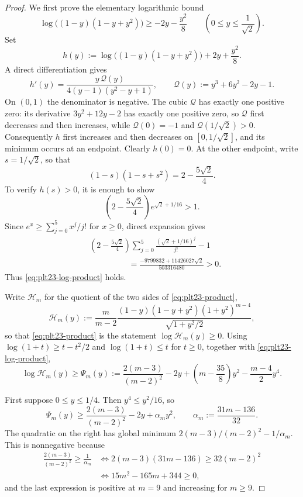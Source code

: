 ﻿\documentclass[11pt]{article}
\numberwithin{equation}{section}
\begin{document}
\begin{proof}
  We first prove the elementary logarithmic bound
  \begin{equation}\label{eq:plt23-log-product}
    \log\bigl((1-y)(1-y+y^2)\bigr)
    \ge -2y-\frac{y^2}{8}
    \qquad
    \left(0\le y\le\frac1{\sqrt2}\right).
  \end{equation}
  Set
  \[
    h(y)
    :=\log\bigl((1-y)(1-y+y^2)\bigr)+2y+\frac{y^2}{8}.
  \]
  A direct differentiation gives
  \[
    h'(y)
    =\frac{y\,\mathcal Q(y)}
           {4(y-1)(y^2-y+1)},
    \qquad
    \mathcal Q(y):=y^3+6y^2-2y-1.
  \]
  On $(0,1)$ the denominator is negative.
  The cubic $\mathcal Q$ has exactly one positive zero: its derivative $3y^2+12y-2$ has exactly one positive zero, so $\mathcal Q$ first decreases and then increases, while $\mathcal Q(0)=-1$ and $\mathcal Q(1/\sqrt2)>0$.
  Consequently $h$ first increases and then decreases on $[0,1/\sqrt2]$, and its minimum occurs at an endpoint.
  Clearly $h(0)=0$.
  At the other endpoint, write $s=1/\sqrt2$, so that
  \[
    (1-s)(1-s+s^2)=2-\frac{5\sqrt2}{4}.
  \]
  To verify $h(s)>0$, it is enough to show
  \[
    \left(2-\frac{5\sqrt2}{4}\right)
    e^{\sqrt2+1/16}>1.
  \]
  Since $e^x\ge\sum_{j=0}^5x^j/j!$ for $x\ge0$, direct expansion gives
  \begin{align*}
   &\left(2-\frac{5\sqrt2}{4}\right)
    \sum_{j=0}^5\frac{(\sqrt2+1/16)^j}{j!}-1\\
   &\hspace{2cm}
    =\frac{-9799832+11426027\sqrt2}{503316480}>0.
  \end{align*}
  Thus \eqref{eq:plt23-log-product} holds.

  Write $\mathcal H_m$ for the quotient of the two sides of \eqref{eq:plt23-product},
  \[
    \mathcal H_m(y)
    :=\frac{m}{m-2}
      \frac{(1-y)(1-y+y^2)(1+y^2)^{m-4}}
           {\sqrt{1+y^2/2}},
  \]
  so that \eqref{eq:plt23-product} is the statement $\log\mathcal H_m(y)\ge0$.
  Using $\log(1+t)\ge t-t^2/2$ and $\log(1+t)\le t$ for $t\ge0$, together with \eqref{eq:plt23-log-product},
  \begin{equation}\label{eq:plt23-Psi-lower}
    \log\mathcal H_m(y)
    \ge
    \Psi_m(y):=
    \frac{2(m-3)}{(m-2)^2}
    -2y
    +\left(m-\frac{35}{8}\right)y^2
    -\frac{m-4}{2}y^4.
  \end{equation}

  First suppose $0\le y\le1/4$.
  Then $y^4\le y^2/16$, so
  \[
    \Psi_m(y)
    \ge
    \frac{2(m-3)}{(m-2)^2}-2y+\alpha_my^2,
    \qquad
    \alpha_m:=\frac{31m-136}{32}.
  \]
  The quadratic on the right has global minimum $2(m-3)/(m-2)^2-1/\alpha_m$.
  This is nonnegative because
  \begin{align*}
    \frac{2(m-3)}{(m-2)^2}\ge\frac1{\alpha_m}
    &\iff
    2(m-3)(31m-136)\ge32(m-2)^2\\
    &\iff
    15m^2-165m+344\ge0,
  \end{align*}
  and the last expression is positive at $m=9$ and increasing for $m\ge9$.


\end{proof}
\end{document}
